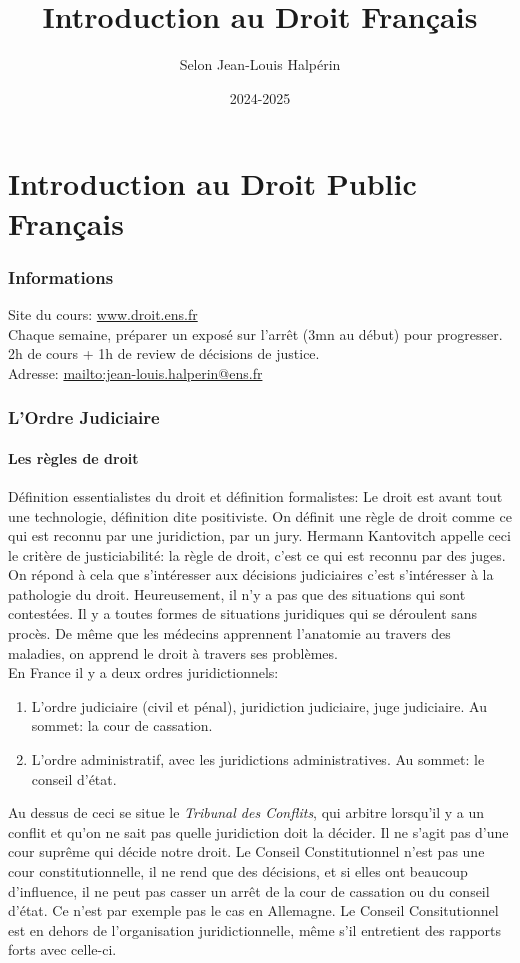 \documentclass[math]{cours}
\author{Selon Jean-Louis Halpérin}
\title{Introduction au Droit Français}
\date{2024-2025}
\begin{document}
\bettertitle

\part{Introduction au Droit Public Français}
\section*{Informations}
Site du cours: \url{www.droit.ens.fr}\\
Chaque semaine, préparer un exposé sur l'arrêt (3mn au début) pour progresser. 2h de cours + 1h de review de décisions de justice.\\
Adresse: \url{mailto:jean-louis.halperin@ens.fr}

\section{L'Ordre Judiciaire}
\subsection{Les règles de droit}
Définition essentialistes du droit et définition formalistes: Le droit est avant tout une technologie, définition dite positiviste.
On définit une règle de droit comme ce qui est reconnu par une juridiction, par un jury.
Hermann Kantovitch appelle ceci le critère de justiciabilité: la règle de droit, c'est ce qui est reconnu par des juges.
On répond à cela que s'intéresser aux décisions judiciaires c'est s'intéresser à la pathologie du droit.
Heureusement, il n'y a pas que des situations qui sont contestées.
Il y a toutes formes de situations juridiques qui se déroulent sans procès.
De même que les médecins apprennent l'anatomie au travers des maladies, on apprend le droit à travers ses problèmes. \\

En France il y a deux ordres juridictionnels:
\begin{enumerate}
	\item L'ordre judiciaire (civil et pénal), juridiction judiciaire, juge judiciaire. Au sommet: la cour de cassation.
	\item L'ordre administratif, avec les juridictions administratives. Au sommet: le conseil d'état.
\end{enumerate}
Au dessus de ceci se situe le \emph{Tribunal des Conflits}, qui arbitre lorsqu'il y a un conflit et qu'on ne sait pas quelle juridiction doit la décider.
Il ne s'agit pas d'une cour suprême qui décide notre droit.
Le Conseil Constitutionnel n'est pas une cour constitutionnelle, il ne rend que des décisions, et si elles ont beaucoup d'influence, il ne peut pas casser un arrêt de la cour de cassation ou du conseil d'état.
Ce n'est par exemple pas le cas en Allemagne.
Le Conseil Consitutionnel est en dehors de l'organisation juridictionnelle, même s'il entretient des rapports forts avec celle-ci.
\end{document}
